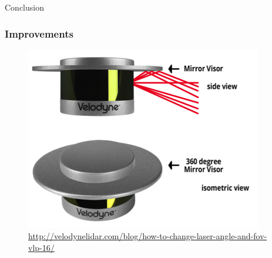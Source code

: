 \documentclass[nosymbols]{beamer}	%
\begin{document}
\begin{frame}
\begin{center}
{\huge Conclusion}
\end{center}
\end{frame}

\begin{frame}
\frametitle{Improvements}
\begin{figure}[!ht]
\begin{center}
\includegraphics[width=\textwidth,height=0.7\textheight,keepaspectratio]{bilder/Blog2.png}\\
\tiny{\url{http://velodynelidar.com/blog/how-to-change-laser-angle-and-fov-vlp-16/}}
\end{center}
\end{figure}
\end{frame}




\addtocounter{framenumber}{-1}
\begin{frame}[plain]
	
	\titlepage
\end{frame}
\end{document}
